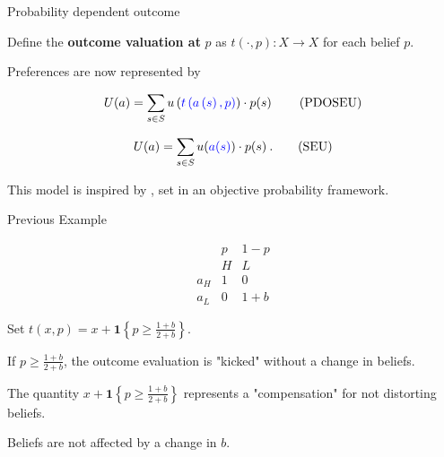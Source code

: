\documentclass[usenames,dvipsnames,aspectratio=169,11pt,envcountsect, handout]{beamer}
\begin{document}
\begin{frame}{Probability dependent outcome}

	Define the \textbf{outcome valuation at} $p$ as $t \left( \cdot, p \right) : X \rightarrow X$ for each belief $p$.

	\vfill

	Preferences are now represented by

	\vfill

	\begin{equation}
		U(a) = \sum_{s \in S} u \left( \textcolor{blue}{t \left(a\left(s\right),p \right)} \right) \cdot p(s) \:
		\tag{PDOSEU}
	\end{equation}

	\begin{equation}
		U(a) = \sum_{s \in S} u(\textcolor{blue}{a(s)}) \cdot p(s) \: .
		\tag{SEU}
	\end{equation}

	\vfill

	This model is inspired by \cite{karniUtilityTheoryProbabilitydependent1992}, set in an objective probability framework.

\end{frame}

\begin{frame}{Previous Example}

	\begin{minipage}{0.45\textwidth}
		\[
			\begin{array}{c|cc}
				           & p & 1 - p \\
				           & H & L     \\
				\hline a_H & 1 & 0     \\
				a_L        & 0 & 1 + b
			\end{array}
		\]
	\end{minipage}
	\begin{minipage}{0.45\textwidth}
		Set $t \left( x , p \right) = x + \mathbf{1} \left\{p \geq \frac{1+b}{2+b} \right\}$.
	\end{minipage}

	\vfill

	If $p \geq \frac{1+b}{2+b}$, the outcome evaluation is "kicked" without a change in beliefs.

	\vfill

	The quantity $x + \mathbf{1} \left\{p \geq \frac{1+b}{2+b} \right\}$ represents a "compensation" for not distorting beliefs.

	\vfill

	Beliefs are not affected by a change in $b$.


\end{frame}
\end{document}
